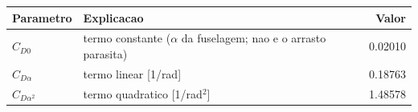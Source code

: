 \begin{tabular}{llr}
\toprule
Parametro & Explicacao & Valor \\
\midrule
$C_{D0}$ & termo constante ($\alpha$ da fuselagem; nao e o arrasto parasita) & 0.02010 \\
$C_{D\alpha}$ & termo linear [1/rad] & 0.18763 \\
$C_{D\alpha^2}$ & termo quadratico [1/rad$^2$] & 1.48578 \\
\bottomrule
\end{tabular}
